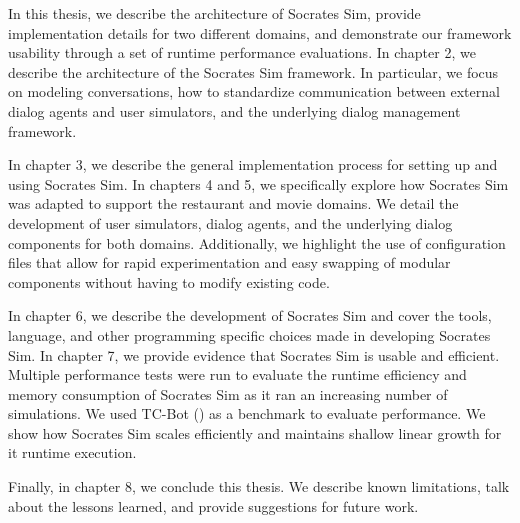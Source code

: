 In this thesis, we describe the architecture of Socrates Sim, provide implementation details for two different domains, and demonstrate our framework usability through a set of runtime performance evaluations. In chapter 2, we describe the architecture of the Socrates Sim framework. In particular, we focus on modeling conversations, how to standardize communication between external dialog agents and user simulators, and the underlying dialog management framework. 

In chapter 3, we describe the general implementation process for setting up and using Socrates Sim. In chapters 4 and 5, we specifically explore how Socrates Sim was adapted to support the restaurant and movie domains. We detail the development of user simulators, dialog agents, and the underlying dialog components for both domains. Additionally, we highlight the use of configuration files that allow for rapid experimentation and easy swapping of modular components without having to modify existing code. 

In chapter 6, we describe the development of Socrates Sim and cover the tools, language, and other programming specific choices made in developing Socrates Sim. In chapter 7, we provide evidence that Socrates Sim is usable and efficient. Multiple performance tests were run to evaluate the runtime efficiency and memory consumption of Socrates Sim as it ran an increasing number of simulations. We used TC-Bot (\cite{li_end_to_end}) as a benchmark to evaluate performance. We show how Socrates Sim scales efficiently and maintains shallow linear growth for it runtime execution.

Finally, in chapter 8, we conclude this thesis. We describe known limitations, talk about the lessons learned, and provide suggestions for future work.

